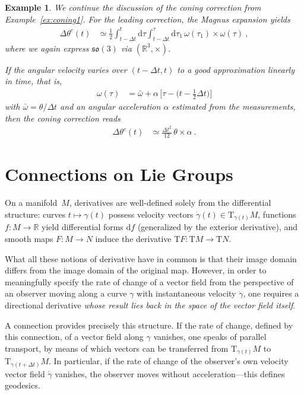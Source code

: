 \documentclass[10pt,a4paper]{article}
\theoremstyle{mytheorem}
\theoremstyle{mydefinition}
\newtheorem{example}[theorem]{Example}
\newcommand{\dt}{\mathrm{d}}
\newcommand{\Tt}{\mathrm{T}}
\newcommand{\fso}{\mathfrak{so}}
\begin{document}
\begin{example}
\label{ex:coning2}
We continue the discussion of the coning correction from Example~\ref{ex:coning1}.
For the leading correction, the Magnus expansion yields
\begin{align*}
	\Delta\theta^c(t)
	&\simeq
	\frac{1}{2}\int_{t-\Delta t}^t\dt \tau\int_{t-\Delta t}^\tau\dt \tau_1 \,
	\omega(\tau_1)\times\omega(\tau)
	\ ,
\end{align*}
where we again express $\fso(3)$ via $(\mathbb{R}^3,\times)$.

If the angular velocity varies over $(t-\Delta t,t)$ to a good approximation linearly in time,
that is,
\begin{align*}
	\omega(\tau)
	&=
	\bar{\omega}
	+ \alpha\,
	\big[
		\tau 
		- \big(
			t - \frac{1}{2}\Delta t
		\big)
	\big]
\end{align*}
with $\bar{\omega}=\theta/\Delta t$ and an angular acceleration $\alpha$ estimated from the measurements,
then the coning correction reads
\begin{align*}
	\Delta\theta^c(t)
	&\simeq
	\frac{\Delta t^2}{12}\,\theta\times\alpha
	\ .
\end{align*}
\end{example}

\section{Connections on Lie Groups}

On a manifold~$M$, derivatives are well-defined solely from the differential structure:
curves $t\mapsto\gamma(t)$ possess velocity vectors $\dot{\gamma}(t)\in\Tt_{\gamma(t)}M$,
functions $f:M\rightarrow\mathbb{R}$ yield differential forms $\dt f$ (generalized by the exterior derivative),
and smooth maps $F:M\rightarrow N$ induce the derivative $\Tt F:\Tt M\rightarrow\Tt N$.

What all these notions of derivative have in common is that their image domain differs from the image domain of the original map.
However, in order to meaningfully specify the rate of change of a vector field from the perspective of an observer moving along a curve $\gamma$ with instantaneous velocity $\dot{\gamma}$, one requires a directional derivative \emph{whose result lies back in the space of the vector field itself}.

A connection provides precisely this structure.
If the rate of change, defined by this connection, of a vector field along $\gamma$ vanishes, one speaks of parallel transport, by means of which vectors can be transferred from $\Tt_{\gamma(t)}M$ to $\Tt_{\gamma(t+\Delta t)}M$.
In particular, if the rate of change of the observer's own velocity vector field $\dot{\gamma}$ vanishes, the observer moves without acceleration---this defines geodesics.
\end{document}
